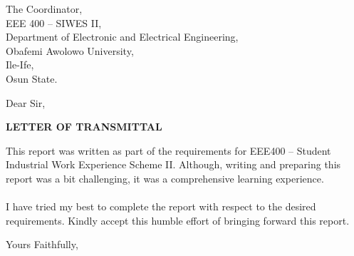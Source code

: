 \documentclass{letter}
\begin{document}
\begin{letter}{The Coordinator,\\EEE 400 – SIWES II,\\Department of Electronic and Electrical Engineering,\\Obafemi Awolowo University,\\Ile-Ife,\\ Osun State.}
\opening{Dear Sir,}
\bigskip
\begin{center}
\textbf{LETTER OF TRANSMITTAL}
\end{center}

This report was written as part of the requirements for EEE400 – Student Industrial
Work Experience Scheme II. Although, writing and preparing this report was a bit
challenging, it was a comprehensive learning experience.\\\\
I have tried my best to complete the report with respect to the desired requirements.
Kindly accept this humble effort of bringing forward this report.
\closing{Yours Faithfully,}
\end{letter}
\end{document}
